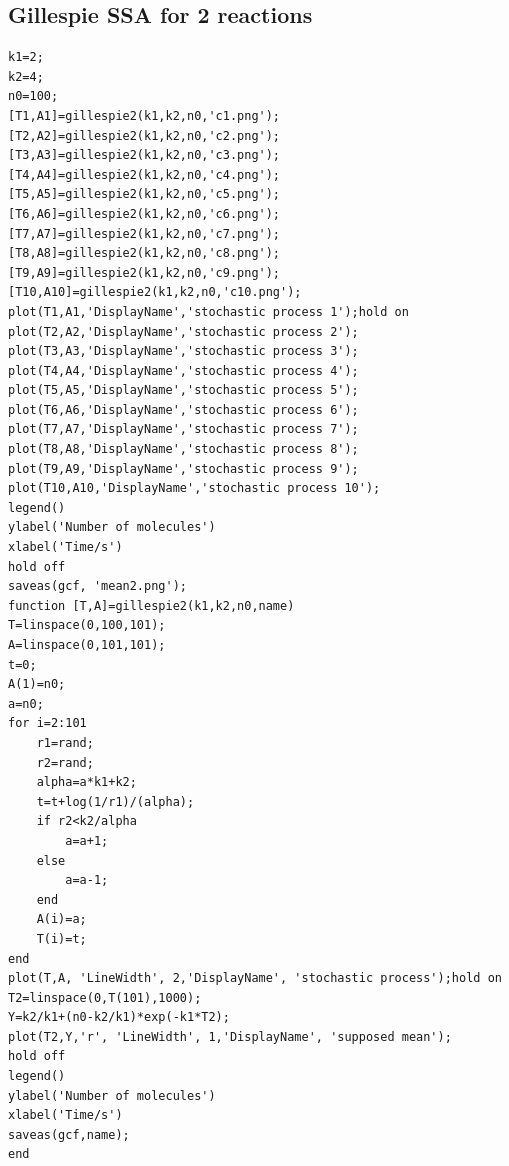 \documentclass{article}
\begin{document}
\subsection{Gillespie SSA for 2 reactions}
\begin{lstlisting}
k1=2;
k2=4;
n0=100;
[T1,A1]=gillespie2(k1,k2,n0,'c1.png');
[T2,A2]=gillespie2(k1,k2,n0,'c2.png');
[T3,A3]=gillespie2(k1,k2,n0,'c3.png');
[T4,A4]=gillespie2(k1,k2,n0,'c4.png');
[T5,A5]=gillespie2(k1,k2,n0,'c5.png');
[T6,A6]=gillespie2(k1,k2,n0,'c6.png');
[T7,A7]=gillespie2(k1,k2,n0,'c7.png');
[T8,A8]=gillespie2(k1,k2,n0,'c8.png');
[T9,A9]=gillespie2(k1,k2,n0,'c9.png');
[T10,A10]=gillespie2(k1,k2,n0,'c10.png');
plot(T1,A1,'DisplayName','stochastic process 1');hold on
plot(T2,A2,'DisplayName','stochastic process 2');
plot(T3,A3,'DisplayName','stochastic process 3');
plot(T4,A4,'DisplayName','stochastic process 4');
plot(T5,A5,'DisplayName','stochastic process 5');
plot(T6,A6,'DisplayName','stochastic process 6');
plot(T7,A7,'DisplayName','stochastic process 7');
plot(T8,A8,'DisplayName','stochastic process 8');
plot(T9,A9,'DisplayName','stochastic process 9');
plot(T10,A10,'DisplayName','stochastic process 10');
legend()
ylabel('Number of molecules')
xlabel('Time/s')
hold off
saveas(gcf, 'mean2.png');
function [T,A]=gillespie2(k1,k2,n0,name)
T=linspace(0,100,101);
A=linspace(0,101,101);
t=0;
A(1)=n0;
a=n0;
for i=2:101
    r1=rand;
    r2=rand;
    alpha=a*k1+k2;
    t=t+log(1/r1)/(alpha);
    if r2<k2/alpha
        a=a+1;
    else
        a=a-1;
    end
    A(i)=a;
    T(i)=t;
end
plot(T,A, 'LineWidth', 2,'DisplayName', 'stochastic process');hold on
T2=linspace(0,T(101),1000);
Y=k2/k1+(n0-k2/k1)*exp(-k1*T2);
plot(T2,Y,'r', 'LineWidth', 1,'DisplayName', 'supposed mean');
hold off
legend()
ylabel('Number of molecules')
xlabel('Time/s')
saveas(gcf,name);
end
\end{lstlisting}
\end{document}
